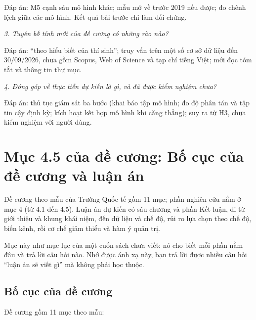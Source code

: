 Đáp án: M5 cạnh sáu mô hình khác; mẫu mở về trước 2019 nếu được; đo chênh lệch giữa các mô hình. Kết quả bài trước chỉ làm đối chứng.

{\itshape 3. Tuyên bố tính mới của đề cương có những rào nào?\par}

Đáp án: “theo hiểu biết của thí sinh”; truy vấn trên một số cơ sở dữ liệu đến 30/09/2026, chưa gồm Scopus, Web of Science và tạp chí tiếng Việt; mới đọc tóm tắt và thông tin thư mục.

{\itshape 4. Đóng góp về thực tiễn dự kiến là gì, và đã được kiểm nghiệm chưa?\par}

Đáp án: thủ tục giám sát ba bước (khai báo tập mô hình; đo độ phân tán và tập tin cậy định kỳ; kích hoạt kết hợp mô hình khi căng thẳng); suy ra từ H3, chưa kiểm nghiệm với người dùng.

\chapter{Mục 4.5 của đề cương: Bố cục của đề cương và luận án}

Đề cương theo mẫu của Trường Quốc tế gồm 11 mục; phần nghiên cứu nằm ở mục 4 (từ 4.1 đến 4.5). Luận án dự kiến có sáu chương và phần Kết luận, đi từ giới thiệu và khung khái niệm, đến dữ liệu và chế độ, rủi ro lựa chọn theo chế độ, biến kênh, rồi cơ chế giảm thiểu và hàm ý quản trị.

Mục này như mục lục của một cuốn sách chưa viết: nó cho biết mỗi phần nằm đâu và trả lời câu hỏi nào. Nhớ được ánh xạ này, bạn trả lời được nhiều câu hỏi “luận án sẽ viết gì” mà không phải học thuộc.

\section{Bố cục của đề cương}

Đề cương gồm 11 mục theo mẫu:

